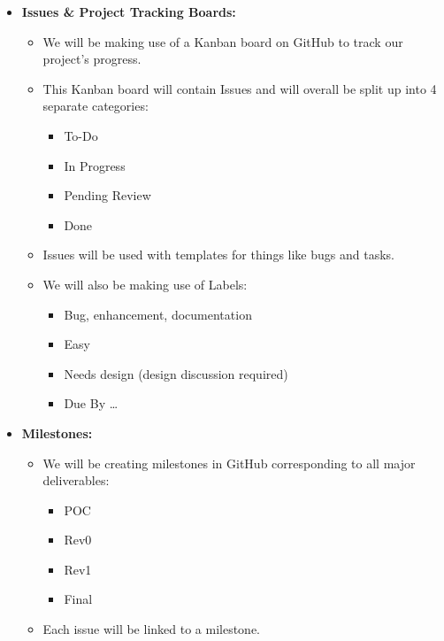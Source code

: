 \documentclass{article}
\begin{document}
\begin{itemize}
    \item \textbf{Issues \& Project Tracking Boards:}
    \begin{itemize}
        \item We will be making use of a Kanban board on GitHub to track our project’s progress.
        \item This Kanban board will contain Issues and will overall be split up into 4 separate categories:
        \begin{itemize}
            \item To-Do
            \item In Progress
            \item Pending Review
            \item Done
        \end{itemize}
        \item Issues will be used with templates for things like bugs and tasks.
        \item We will also be making use of Labels:
        \begin{itemize}
            \item Bug, enhancement, documentation
            \item Easy
            \item Needs design (design discussion required)
            \item Due By \dots
        \end{itemize}
    \end{itemize}

    \item \textbf{Milestones:}
    \begin{itemize}
        \item We will be creating milestones in GitHub corresponding to all major deliverables:
        \begin{itemize}
            \item POC
            \item Rev0
            \item Rev1
            \item Final
        \end{itemize}
        \item Each issue will be linked to a milestone.
    \end{itemize}


\end{itemize}
\end{document}
